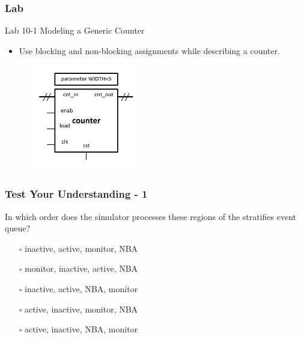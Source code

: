 \documentclass[t, notes, xcolor=table]{beamer}
\begin{document}
\begin{frame}
\frametitle{Lab}
Lab 10-1 Modeling a Generic Counter
\begin{itemize}
\item Use blocking and non-blocking assignments while describing a counter.
\end{itemize}
\begin{figure}
    \includegraphics[width=0.45\textwidth]{img/09_lab.png}
\end{figure}
\end{frame}


\begin{frame}
\frametitle{Test Your Understanding - 1}
In which order does the simulator processes these regions of the stratifies event queue?
\begin{itemize}
\item[$\square$] inactive, active, monitor, NBA
\item[$\square$] monitor, inactive, active, NBA
\item[$\square$] inactive, active, NBA, monitor
\item[$\square$] active, inactive, monitor, NBA
\item[$\square$] active, inactive, NBA, monitor
\end{itemize}
\end{frame}
\end{document}

